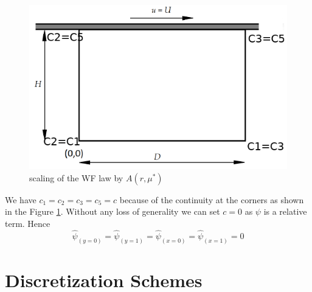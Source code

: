 \documentclass{article}
\begin{document}
\begin{figure}[h!]
\centering
\includegraphics[scale=.4]{cavityFig2.png}
\caption{scaling of the WF law by $A\left(r,\mu^*\right)$}
\label{fig:cavityFig2}
\end{figure}

We have $c_1=c_2=c_3=c_5=c$ because of the continuity at the corners as shown in the Figure \ref{fig:cavityFig2}. Without any loss of generality we can set $c=0$ as $\psi$ is a relative term.
Hence
\begin{equation}
\hat{\psi}_{(y=0)}=\hat{\psi}_{(y=1)}=\hat{\psi}_{(x=0)}=\hat{\psi}_{(x=1)}=0
\end{equation}




\section{ Discretization Schemes}
\end{document}
